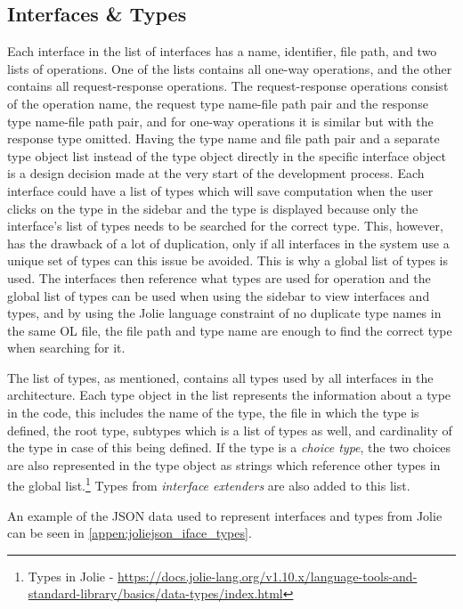 \subsection{Interfaces \& Types}
Each interface in the list of interfaces has a name, identifier, file path, and two lists of operations.
One of the lists contains all one-way operations, and the other contains all request-response operations.
The request-response operations consist of the operation name, the request type name-file path pair and the response type name-file path pair, and for one-way operations it is similar but with the response type omitted.
Having the type name and file path pair and a separate type object list instead of the type object directly in the specific interface object is a design decision made at the very start of the development process.
Each interface could have a list of types which will save computation when the user clicks on the type in the sidebar and the type is displayed because only the interface's list of types needs to be searched for the correct type.
This, however, has the drawback of a lot of duplication, only if all interfaces in the system use a unique set of types can this issue be avoided.
This is why a global list of types is used. The interfaces then reference what types are used for operation and the global list of types can be used when using the sidebar to view interfaces and types, and by
using the Jolie language constraint of no duplicate type names in the same OL file, the file path and type name are enough to find the correct type when searching for it.

The list of types, as mentioned, contains all types used by all interfaces in the architecture.
Each type object in the list represents the information about a type in the code, this includes the name of the type, the file in which the type is defined, the root type, subtypes which is a list of types as well, and cardinality of the type in case of this being defined.
If the type is a \textit{choice type}, the two choices are also represented in the type object as strings which reference other types in the global list.\footnote{Types in Jolie - \url{https://docs.jolie-lang.org/v1.10.x/language-tools-and-standard-library/basics/data-types/index.html}}
Types from \textit{interface extenders} are also added to this list.

An example of the JSON data used to represent interfaces and types from Jolie can be seen in \cref{appen:joliejson_iface_types}.

